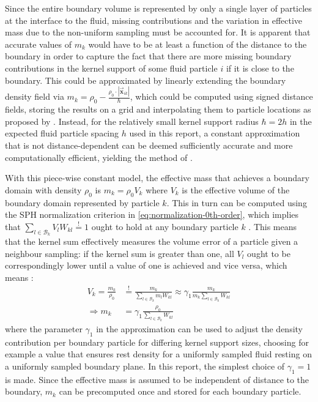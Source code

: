 \documentclass[oneside, a4paper]{book}
\newcommand\abs[1]{\left|#1\right|}
\newcommand\vek[1]{\vec{\bm{#1}}}
\begin{document}
    Since the entire boundary volume is represented by only a single layer of particles at the interface to the fluid, missing contributions and the variation in effective mass due to the non-uniform sampling must be accounted for. It is apparent that accurate values of $m_k$ would have to be at least a function of the distance to the boundary in order to capture the fact that there are more missing boundary contributions in the kernel support of some fluid particle $i$ if it is close to the boundary. This could be approximated by linearly extending the boundary density field via $m_k = \rho_0 - \frac{\rho_0\cdot \abs{\vek{x}_{ik}}}{\hbar}$, which could be computed using signed distance fields, storing the results on a grid and interpolating them to particle locations as proposed by \autocite[Koshier and Bender]{density-maps}. Instead, for the relatively small kernel support radius $\hbar=2h$ in the expected fluid particle spacing $h$ used in this report, a constant approximation that is not distance-dependent can be deemed sufficiently accurate and more computationally efficient, yielding the method of \autocite[Akinci et al.]{versatile-boundary-akinci}.

    With this piece-wise constant model, the effective mass that achieves a boundary domain with density $\rho_0$ is $m_k = \rho_0V_k$ where $V_k$ is the effective volume of the boundary domain represented by particle $k$. This in turn can be computed using the SPH normalization criterion in \autoref{eq:normalization-0th-order}, which implies that $\sum_{l\in\mathcal{B}_k} V_l W_{kl}\overset{!}{=} 1$ ought to hold at any boundary particle $k$ \autocite{versatile-boundary-akinci}. This means that the kernel sum effectively measures the volume error of a particle given a neighbour sampling: if the kernel sum is greater than one, all $V_l$ ought to be correspondingly lower until a value of one is achieved and vice versa, which means \autocite{versatile-boundary-akinci}: 
    \begin{align}
      V_k = \frac{m_k}{\rho_0} &\overset{!}{=} \frac{m_k}{\sum_{l\in\mathcal{B}_k} m_l W_{kl}} \approx \gamma_1 \frac{ m_k}{m_k \sum_{l\in\mathcal{B}_k} W_{kl}}\label{eq:boundary-mass-approximation}\\
      \Longrightarrow m_k &= \gamma_1 \frac{\rho_0}{\sum_{l\in\mathcal{B}_k} W_{kl}}\label{eq:boundary-mass-calculation}
    \end{align}
    where the parameter $\gamma_1$ in the approximation can be used to adjust the density contribution per boundary particle for differing kernel support sizes, choosing for example a value that ensures rest density for a uniformly sampled fluid resting on a uniformly sampled boundary plane. In this report, the simplest choice of $\gamma_1=1$ is made. 
    Since the effective mass is assumed to be independent of distance to the boundary, $m_k$ can be precomputed once and stored for each boundary particle.
    
\end{document}
